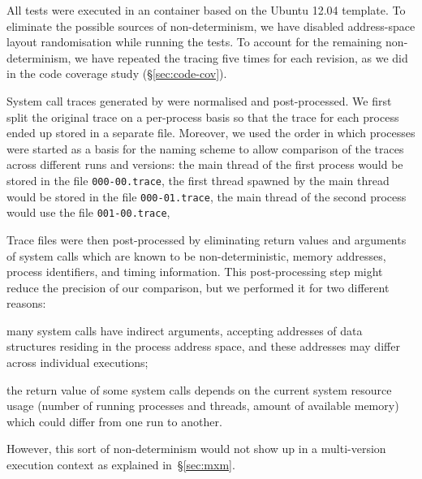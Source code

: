 All tests were executed in an \lxc container based on the Ubuntu 12.04
template.  To eliminate the possible sources of non-determinism, we have
disabled address-space layout randomisation while running the tests. To
account for the remaining non-determinism, we have repeated the tracing five
times for each revision, as we did in the code coverage
study (\S\ref{sec:code-cov}).

System call traces generated by \perf were normalised and
post-processed. We first split the original trace on a per-process basis so
that the trace for each process ended up stored in a separate file.
Moreover, we used the order in which processes were started as a basis for the
naming scheme to allow comparison of the traces across different runs and
versions: the main thread of the first process would be stored in the file
\texttt{000-00.trace}, the first thread spawned by the main thread would be
stored in the file \texttt{000-01.trace}, the main thread of the second
process would use the file \texttt{001-00.trace}, \etc


Trace files were then post-processed by eliminating return values and arguments
of system calls which are known to be non-deterministic, \ie memory addresses,
process identifiers, and timing information. This post-processing step
might reduce the precision of our comparison, but we performed it for two
different reasons:%
\begin{inparaenum}[(1)]
\item many system calls have indirect arguments, accepting addresses of data
  structures residing in the process address space, and these addresses may
  differ across individual executions;
\item the return value of some system calls depends on the current system
  resource usage (\eg number of running processes and threads, amount of
  available memory) which could differ from one run to another.
\end{inparaenum}
However, this sort of non-determinism would not show up in a multi-version
execution context as explained in~\S\ref{sec:mxm}.

